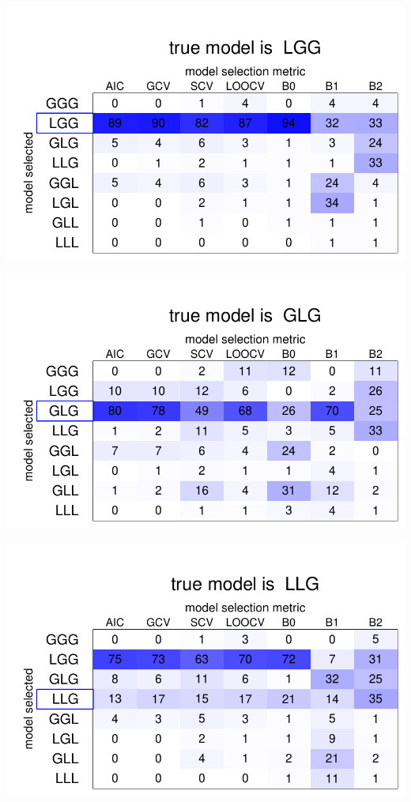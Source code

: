 \documentclass{article}\usepackage[]{graphicx}\usepackage[]{color}
\makeatletter
\def\maxwidth{ %
  \ifdim\Gin@nat@width>\linewidth
    \linewidth
  \else
    \Gin@nat@width
  \fi
}
\newenvironment{knitrout}{}{} %
\makeatother
\begin{document}
\begin{knitrout}
\includegraphics[width=\maxwidth]{figure/ModelSelectionTabulations12} 

\includegraphics[width=\maxwidth]{figure/ModelSelectionTabulations13} 

\includegraphics[width=\maxwidth]{figure/ModelSelectionTabulations14} 


\end{knitrout}
\end{document}
